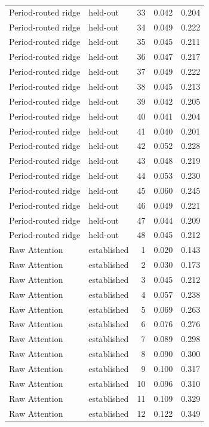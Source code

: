 \begin{tabular}{llrrr}
Period-routed ridge & held-out & 33 & 0.042 & 0.204 \\
Period-routed ridge & held-out & 34 & 0.049 & 0.222 \\
Period-routed ridge & held-out & 35 & 0.045 & 0.211 \\
Period-routed ridge & held-out & 36 & 0.047 & 0.217 \\
Period-routed ridge & held-out & 37 & 0.049 & 0.222 \\
Period-routed ridge & held-out & 38 & 0.045 & 0.213 \\
Period-routed ridge & held-out & 39 & 0.042 & 0.205 \\
Period-routed ridge & held-out & 40 & 0.041 & 0.204 \\
Period-routed ridge & held-out & 41 & 0.040 & 0.201 \\
Period-routed ridge & held-out & 42 & 0.052 & 0.228 \\
Period-routed ridge & held-out & 43 & 0.048 & 0.219 \\
Period-routed ridge & held-out & 44 & 0.053 & 0.230 \\
Period-routed ridge & held-out & 45 & 0.060 & 0.245 \\
Period-routed ridge & held-out & 46 & 0.049 & 0.221 \\
Period-routed ridge & held-out & 47 & 0.044 & 0.209 \\
Period-routed ridge & held-out & 48 & 0.045 & 0.212 \\
Raw Attention & established & 1 & 0.020 & 0.143 \\
Raw Attention & established & 2 & 0.030 & 0.173 \\
Raw Attention & established & 3 & 0.045 & 0.212 \\
Raw Attention & established & 4 & 0.057 & 0.238 \\
Raw Attention & established & 5 & 0.069 & 0.263 \\
Raw Attention & established & 6 & 0.076 & 0.276 \\
Raw Attention & established & 7 & 0.089 & 0.298 \\
Raw Attention & established & 8 & 0.090 & 0.300 \\
Raw Attention & established & 9 & 0.100 & 0.317 \\
Raw Attention & established & 10 & 0.096 & 0.310 \\
Raw Attention & established & 11 & 0.109 & 0.329 \\
Raw Attention & established & 12 & 0.122 & 0.349 \\

\end{tabular}
